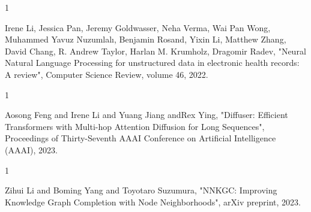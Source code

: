 
\begin{雑誌論文}{1}

Irene Li, Jessica Pan, Jeremy Goldwasser, Neha Verma, Wai Pan Wong, Muhammed Yavuz Nuzumlalı, Benjamin Rosand, Yixin Li, Matthew Zhang, David Chang, R. Andrew Taylor, Harlan M. Krumholz, Dragomir Radev, "Neural Natural Language Processing for unstructured data in electronic health records: A review", Computer Science Review, volume 46, 2022.

\end{雑誌論文}

\begin{査読付}{1}

Aosong Feng and Irene Li and Yuang Jiang andRex  Ying, "Diffuser: Efficient Transformers with Multi-hop Attention Diffusion for Long Sequences", Proceedings of Thirty-Seventh AAAI Conference on Artificial Intelligence (AAAI), 2023.

\end{査読付}

\begin{発表}{1}

Zihui Li and Boming Yang and Toyotaro Suzumura, "NNKGC: Improving Knowledge Graph Completion with Node Neighborhoods", arXiv preprint, 2023.

\end{発表}